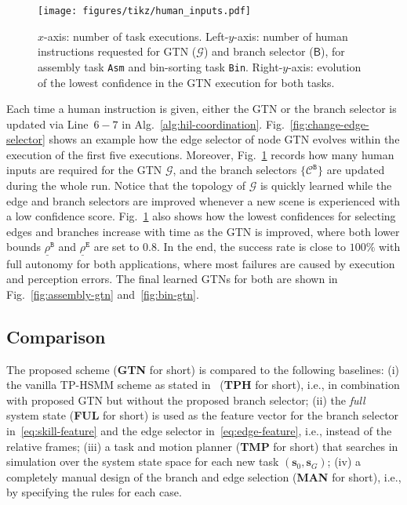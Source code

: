 \begin{figure}[t!]
    \centering
    \texttt{[image: figures/tikz/human\_inputs.pdf]}
    \caption{$x$-axis: number of task executions. Left-$y$-axis: number of human instructions requested for GTN ($\mathcal{G}$) and branch selector ($\mathsf{B}$), for assembly task \texttt{Asm} and bin-sorting task \texttt{Bin}.
    Right-$y$-axis: evolution of the lowest confidence in the GTN execution for both tasks.}
    \label{fig:human-input-change}
    \vspace{-0.15cm}
\end{figure}

Each time a human instruction is given, either the GTN or the branch selector is updated via Line~$6-7$ in Alg.~\ref{alg:hil-coordination}.
Fig.~\ref{fig:change-edge-selector} shows an example how the edge selector of node GTN evolves within the execution of the first five executions.
Moreover, Fig.~\ref{fig:human-input-change} records how many human inputs are required for the GTN $\mathcal{G}$, and the branch selectors $\{\mathcal{C}^{\texttt{B}}\}$ are updated during the whole run.
Notice that the topology of $\mathcal{G}$ is quickly learned while the edge and branch selectors are improved whenever a new scene is experienced with a low confidence score. 
Fig.~\ref{fig:human-input-change} also shows how the lowest confidences for selecting edges and branches increase with time as the GTN is improved, 
where both lower bounds $\underline{\rho}^\texttt{B}$ and $\underline{\rho}^\texttt{E}$ are set to $0.8$.
In the end, the success rate is close to $100\%$ with full autonomy for both applications, where most failures are caused by execution and perception errors. 
The final learned GTNs for both are shown in Fig.~\ref{fig:assembly-gtn} and~\ref{fig:bin-gtn}.



\subsection{Comparison} \label{subsec:comparison}
The proposed scheme (\textbf{GTN} for short) is compared to the following baselines:
(i) the vanilla TP-HSMM scheme as stated in~\cite{calinon2016tutorial, rozo2020learning} (\textbf{TPH} for short), i.e., in combination with proposed GTN but without the proposed branch selector;
(ii) the \emph{full} system state (\textbf{FUL} for short) is used as the feature vector for the branch selector in~\eqref{eq:skill-feature} and the edge selector in~\eqref{eq:edge-feature}, 
i.e., instead of the relative frames;
(iii) a task and motion planner (\textbf{TMP} for short) that searches in simulation over the system state space for each new task $(\boldsymbol{s}_0, \boldsymbol{s}_G)$;
(iv) a completely manual design of the branch and edge selection (\textbf{MAN} for short), 
i.e., by specifying the rules for each case.

